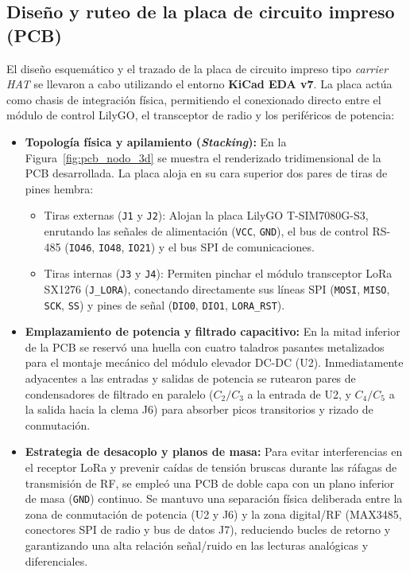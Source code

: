 \subsection{Diseño y ruteo de la placa de circuito impreso (PCB)}
El diseño esquemático y el trazado de la placa de circuito impreso tipo \textit{carrier HAT} se llevaron a cabo utilizando el entorno \textbf{KiCad EDA v7}. La placa actúa como chasis de integración física, permitiendo el conexionado directo entre el módulo de control LilyGO, el transceptor de radio y los periféricos de potencia:

\begin{itemize}
    \item \textbf{Topología física y apilamiento (\textit{Stacking}):} En la Figura~\ref{fig:pcb_nodo_3d} se muestra el renderizado tridimensional de la PCB desarrollada. La placa aloja en su cara superior dos pares de tiras de pines hembra:
    \begin{itemize}
        \item Tiras externas (\texttt{J1} y \texttt{J2}): Alojan la placa LilyGO T-SIM7080G-S3, enrutando las señales de alimentación (\texttt{VCC}, \texttt{GND}), el bus de control RS-485 (\texttt{IO46}, \texttt{IO48}, \texttt{IO21}) y el bus SPI de comunicaciones.
        \item Tiras internas (\texttt{J3} y \texttt{J4}): Permiten pinchar el módulo transceptor LoRa SX1276 (\texttt{J\_LORA}), conectando directamente sus líneas SPI (\texttt{MOSI}, \texttt{MISO}, \texttt{SCK}, \texttt{SS}) y pines de señal (\texttt{DIO0}, \texttt{DIO1}, \texttt{LORA\_RST}).
    \end{itemize}
    \item \textbf{Emplazamiento de potencia y filtrado capacitivo:} En la mitad inferior de la PCB se reservó una huella con cuatro taladros pasantes metalizados para el montaje mecánico del módulo elevador DC-DC (U2). Inmediatamente adyacentes a las entradas y salidas de potencia se rutearon pares de condensadores de filtrado en paralelo ($C_2/C_3$ a la entrada de U2, y $C_4/C_5$ a la salida hacia la clema J6) para absorber picos transitorios y rizado de conmutación.
    \item \textbf{Estrategia de desacoplo y planos de masa:} Para evitar interferencias en el receptor LoRa y prevenir caídas de tensión bruscas durante las ráfagas de transmisión de RF, se empleó una PCB de doble capa con un plano inferior de masa (\texttt{GND}) continuo. Se mantuvo una separación física deliberada entre la zona de conmutación de potencia (U2 y J6) y la zona digital/RF (MAX3485, conectores SPI de radio y bus de datos J7), reduciendo bucles de retorno y garantizando una alta relación señal/ruido en las lecturas analógicas y diferenciales.
\end{itemize}

